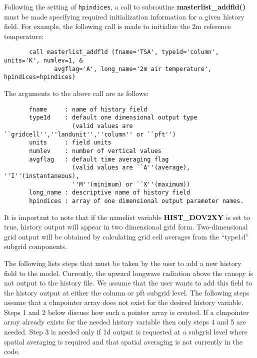 Following the setting of {\tt hpindices}, a call to subroutine {\bf
masterlist\_addfld()} must be made specifying required initialization
information for a given history field. For example, the following call
is made to initialize the 2m reference temperature:
\begin{verbatim}
       call masterlist_addfld (fname='TSA', type1d='column', units='K', numlev=1, &
              avgflag='A', long_name='2m air temperature', hpindices=hpindices)        
\end{verbatim}
The arguments to the above call are as follows:
\begin{verbatim}
       fname     : name of history field
       type1d    : default one dimensional output type 
                   (valid values are ``gridcell'',''landunit'',''column'' or ``pft'')
       units     : field units
       numlev    : number of vertical values
       avgflag   : default time averaging flag
                   (valid values are ``A''(average), ''I''(instantaneous),
                   ''M''(minimum) or ``X''(maximum))
       long_name : descriptive name of history field
       hpindices : array of one dimensional output parameter names.
\end{verbatim}
It is important to note that if the namelist variable {\bf
HIST\_DOV2XY} is set to true, history output will appear in two
dimensional grid form.  Two-dimensional grid output will be obtained
by calculating grid cell averages from the ``type1d'' subgrid
components.
 
The following lists steps that must be taken by the user to add a new
history field to the model. Currently, the upward longwave radiation
above the canopy is not output to the history file. We assume that the
user wants to add this field to the history output at either the
column or pft subgrid level. The following steps assume that a
clmpointer array does not exist for the desired history
variable. Steps 1 and 2 below discuss how such a pointer array is
created. If a clmpointer array already exists for the needed history
variable then only steps 4 and 5 are needed. Step 3 is needed only if
1d output is requested at a subgrid level where spatial averaging is
required and that spatial averaging is not currently in the code.

